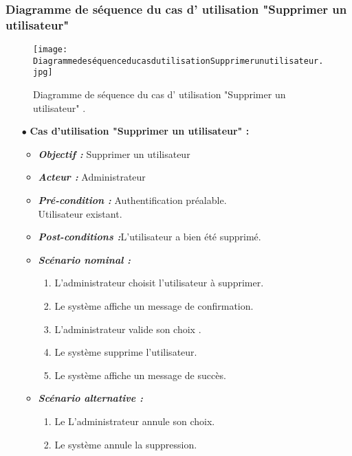 \subsubsection{Diagramme de séquence du cas d' utilisation "Supprimer un utilisateur" }
\begin{figure}[ht]
	\centering
	\texttt{[image: DiagrammedeséquenceducasdutilisationSupprimerunutilisateur.jpg]}
	\caption{ Diagramme de séquence du cas d' utilisation "Supprimer un utilisateur"  .}
	\label{fig: Diagramme de séquence du cas d' utilisation Supprimer un utilisateur  }
\end{figure}
\FloatBarrier
{}
\begin{itemize}
	\item[$\bullet$] \textbf{Cas d’utilisation "Supprimer un utilisateur" :} 
	\medskip
	\begin{itemize}
		\item \textit{\textbf{Objectif :}} Supprimer un utilisateur	
		\item \textit{\textbf{Acteur :}} Administrateur	
		\item \textit{\textbf{Pré-condition  :}} Authentification préalable.\\
		Utilisateur existant.
		\item \textit{\textbf{Post-conditions   :}}L’utilisateur a bien été supprimé.
		\item \textit{\textbf{Scénario nominal :}}
		\begin{enumerate}
			\item L’administrateur choisit l’utilisateur à supprimer. 
			\item Le système affiche un message de confirmation. 
			\item  L’administrateur valide son choix . 
			\item  Le système supprime l’utilisateur.  
			\item Le système affiche un message de succès.
		\end{enumerate}
		\item \textit{\textbf{Scénario alternative :}}
		\begin{enumerate}
			\item Le L’administrateur annule son choix.
			\item Le système annule la suppression.
		\end{enumerate}
	\end{itemize}
\end{itemize}	
\bigskip
